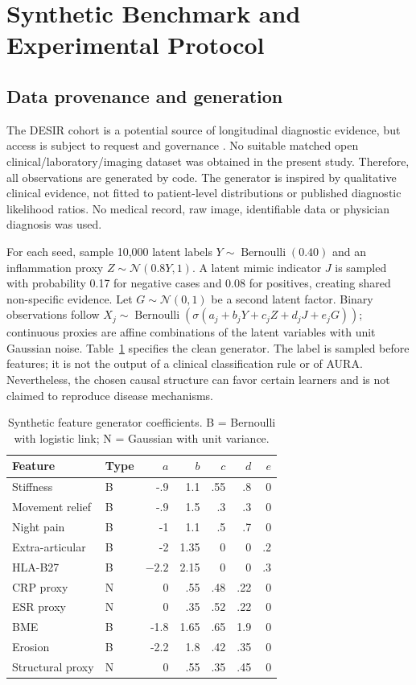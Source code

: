 \documentclass[conference]{IEEEtran}
\begin{document}
\section{Synthetic Benchmark and Experimental Protocol}
\subsection{Data provenance and generation}
The DESIR cohort is a potential source of longitudinal diagnostic evidence, but access is subject to request and governance \cite{desir}. No suitable matched open clinical/laboratory/imaging dataset was obtained in the present study. Therefore, all observations are generated by code. The generator is inspired by qualitative clinical evidence, not fitted to patient-level distributions or published diagnostic likelihood ratios. No medical record, raw image, identifiable data or physician diagnosis was used.

For each seed, sample 10,000 latent labels $Y\sim\operatorname{Bernoulli}(0.40)$ and an inflammation proxy $Z\sim\mathcal N(0.8Y,1)$. A latent mimic indicator $J$ is sampled with probability 0.17 for negative cases and 0.08 for positives, creating shared non-specific evidence. Let $G\sim\mathcal N(0,1)$ be a second latent factor. Binary observations follow $X_j\sim\operatorname{Bernoulli}(\sigma(a_j+b_jY+c_jZ+d_jJ+e_jG))$; continuous proxies are affine combinations of the latent variables with unit Gaussian noise. Table~\ref{tab:coeff} specifies the clean generator. The label is sampled before features; it is not the output of a clinical classification rule or of AURA. Nevertheless, the chosen causal structure can favor certain learners and is not claimed to reproduce disease mechanisms.
\begin{table}[t]
\caption{Synthetic feature generator coefficients. B = Bernoulli with logistic link; N = Gaussian with unit variance.}
\label{tab:coeff}
\centering\footnotesize
\begin{tabular}{@{}llrrrrr@{}}\toprule
Feature & Type & $a$ & $b$ & $c$ & $d$ & $e$\\\midrule
Stiffness & B & -.9 & 1.1 & .55 & .8 & 0\\
Movement relief & B & -.9 & 1.5 & .3 & .3 & 0\\
Night pain & B & -1 & 1.1 & .5 & .7 & 0\\
Extra-articular & B & -2 & 1.35 & 0 & 0 & .2\\
HLA-B27 & B & $-2.2$ & 2.15 & 0 & 0 & .3\\
CRP proxy & N & 0 & .55 & .48 & .22 & 0\\
ESR proxy & N & 0 & .35 & .52 & .22 & 0\\
BME & B & -1.8 & 1.65 & .65 & 1.9 & 0\\
Erosion & B & -2.2 & 1.8 & .42 & .35 & 0\\
Structural proxy & N & 0 & .55 & .35 & .45 & 0\\\bottomrule
\end{tabular}
\end{table}
\end{document}
